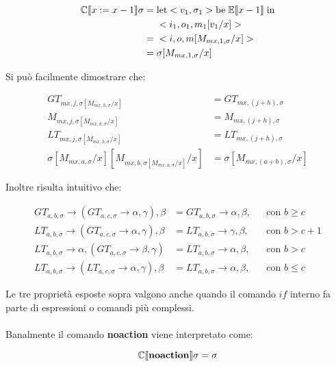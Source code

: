     \begin{align*}
        \mathbb{C}\llbracket x:=x-1 \rrbracket\sigma =\;& \mbox{let} <v_1,\sigma_1> \mbox{be}\; \mathbb{E}\llbracket x-1 \rrbracket\; \mbox{in}\\
        &<i_1,o_1,m_1[v_1/x]>\\
        =\;& <i,o,m[M_{mx,1,\sigma}/x]>\\
        =\;& \sigma[M_{mx,1,\sigma}/x]
    \end{align*}
    
    Si può facilmente dimostrare che:
    
    \begin{align*}
        GT_{mx,j,\sigma[M_{mx,h,\sigma}/x]} &= GT_{mx, (j+h), \sigma}\\
        M_{mx,j,\sigma[M_{mx,h,\sigma}/x]} &= M_{mx, (j+h), \sigma}\\
        LT_{mx,j,\sigma[M_{mx,h,\sigma}/x]} &= LT_{mx, (j+h), \sigma}\\
        \sigma[M_{mx,a,\sigma}/x][M_{mx,b,\sigma[M_{mx,a,\sigma}/x]}/x] &= \sigma[M_{mx,(a+b),\sigma}/x]
    \end{align*}
    
    Inoltre risulta intuitivo che:
    
    \begin{align*}
        GT_{a,b,\sigma} \rightarrow (GT_{a,c,\sigma} \rightarrow \alpha, \gamma), \beta &= GT_{a,b,\sigma} \rightarrow \alpha, \beta, &&\mbox{con $b\geq c$}\\
        LT_{a,b,\sigma} \rightarrow (GT_{a,c,\sigma} \rightarrow \alpha, \gamma), \beta &= LT_{a,b,\sigma} \rightarrow \gamma, \beta, &&\mbox{con $b > c+1$}\\
        LT_{a,b,\sigma} \rightarrow \alpha, (GT_{a,c,\sigma} \rightarrow \beta, \gamma) &= LT_{a,b,\sigma} \rightarrow \alpha, \beta, &&\mbox{con $b > c$}\\
        LT_{a,b,\sigma} \rightarrow (LT_{a,c,\sigma} \rightarrow \alpha, \gamma), \beta &= LT_{a,b,\sigma} \rightarrow \alpha, \beta, &&\mbox{con $b\leq c$}
    \end{align*}
    
    Le tre proprietà esposte sopra valgono anche quando il comando $if$ interno fa parte di espressioni o comandi più complessi.\\
    \\
    Banalmente il comando \textbf{noaction} viene interpretato come:
    
    \begin{equation*}
        \mathbb{C}\llbracket \mbox{\textbf{noaction}} \rrbracket\sigma = \sigma
    \end{equation*}
    
